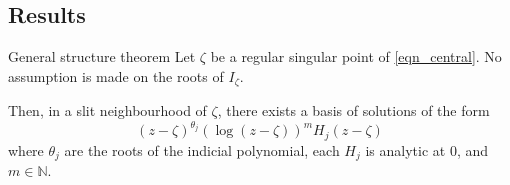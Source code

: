 \documentclass[../main.tex]{subfiles}
\begin{document}
%
%	
%	
%	
%	
%	
%	
%	

\subsection*{Results}


\begin{thm}{General structure theorem}
	Let $\zeta$ be a regular singular point of \eqref{eqn_central}. No assumption is made on the roots of $I_\zeta$.
	
	Then, in a slit neighbourhood of $\zeta$, there exists a basis of solutions of the form
	\begin{equation}\label{general_structure_form}
	{(z - \zeta)}^{\theta_j} {(\log (z - \zeta))}^m H_j (z - \zeta)
	\end{equation}
	where $\theta_j$ are the roots of the indicial polynomial, each $H_j$ is analytic at 0, and $m \in \mathbb{N}$. 
\end{thm}
\end{document}
